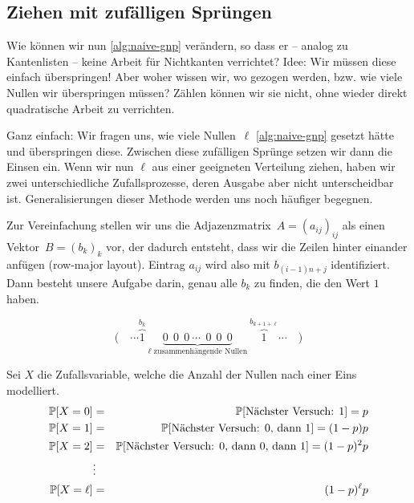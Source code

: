 \subsection{Ziehen mit zufälligen Sprüngen}\label{subsec:gnp_zufaellige_spruenge}
Wie können wir nun \cref{alg:naive-gnp} verändern, so dass er -- analog zu Kantenlisten -- keine Arbeit für Nichtkanten verrichtet?
Idee: Wir müssen diese einfach überspringen!
Aber woher wissen wir, wo  gezogen werden, bzw. wie viele Nullen wir überspringen müssen?
Zählen können wir sie nicht, ohne wieder direkt quadratische Arbeit zu verrichten.

Ganz  einfach: Wir fragen uns, wie viele Nullen~$\ell$ \cref{alg:naive-gnp} gesetzt hätte und überspringen diese.
Zwischen diese zufälligen Sprünge setzen wir dann die Einsen ein.
Wenn wir nun $\ell$ aus einer geeigneten Verteilung ziehen, haben wir zwei unterschiedliche Zufallsprozesse, deren Ausgabe aber nicht unterscheidbar ist.
Generalisierungen dieser Methode werden uns noch häufiger begegnen.

Zur  Vereinfachung stellen wir uns die Adjazenzmatrix~$A = (a_{ij})_{ij}$ als einen Vektor~$B = (b_k)_k$ vor, der dadurch entsteht, dass wir die Zeilen hinter einander anfügen (row-major layout).
Eintrag $a_{ij}$ wird also mit $b_{(i-1)n + j}$ identifiziert.
Dann besteht unsere Aufgabe darin, genau alle $b_k$ zu finden, die den Wert $1$ haben.

\begin{equation}
    \Big(\quad \cdots \overbrace{1}^{b_k} \ \underbrace{0 \ \ 0\ \ 0 \ \cdots\ \ 0\ \ 0\ \ 0}_{\text{$\ell$ zusammenhängende Nullen}}\  \overbrace{1}^{b_{k + 1+ \ell}} \cdots \quad \Big)
\end{equation}

\noindent
Sei $X$ die  Zufallsvariable, welche die Anzahl der Nullen nach einer Eins modelliert.
\begin{eqnarray}
    \mathbb{P}\!\left[X = 0\right] &=& \mathbb{P}\!\left[\textnormal{Nächster Versuch: 1}\right] = p \\
    \mathbb{P}\!\left[X = 1\right] &=& \mathbb{P}\!\left[\textnormal{Nächster Versuch: 0, dann 1}\right] = (1 - p)p \\
    \mathbb{P}\!\left[X = 2\right] &=& \mathbb{P}\!\left[\textnormal{Nächster Versuch: 0, dann 0, dann 1}\right] = (1 - p)^2 p \\
    &\vdots& \\
    \mathbb{P}\!\left[X = \ell\right] &=& (1 - p)^\ell p
\end{eqnarray}

